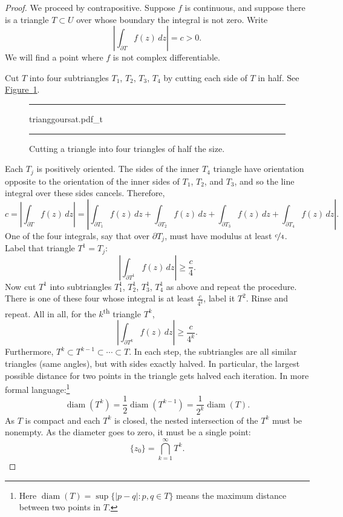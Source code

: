 \documentclass[12pt,openany]{book}
\newcommand{\sabs}[1]{\lvert {#1} \rvert}
\newcommand{\abs}[1]{\left\lvert {#1} \right\rvert}
\theoremstyle{plain}
\theoremstyle{remark}
\theoremstyle{definition}
\newenvironment{myfig}{%
\begin{figure}[h!t]
\noindent\rule{\textwidth}{0.5pt}\vspace{12pt}\par\centering}%
{\par\noindent\rule{\textwidth}{0.5pt}
\end{figure}}
\theoremstyle{exercise}
\theoremstyle{example}
\newcommand{\figureref}[1]{\hyperref[#1]{Figure~\ref*{#1}}}
\begin{document}
\begin{proof}
We proceed by contrapositive.
Suppose $f$ is continuous, and 
suppose there is a triangle $T \subset U$ over whose boundary the integral is not zero.
Write
\begin{equation*}
\abs{\int_{\partial T} f(z) \, dz} = c > 0 .
\end{equation*}
We will find a point
where $f$ is not complex differentiable.

Cut $T$ into four subtriangles
$T_1$, $T_2$, $T_3$, $T_4$ by cutting each side of $T$ in half.  See
\figureref{fig:trianggoursat}.
\begin{myfig}
{trianggoursat.pdf_t}
\caption{Cutting a triangle into four triangles of half the size.%
\label{fig:trianggoursat}}
\end{myfig}

Each $T_j$ is positively oriented.
The sides of the inner $T_4$ triangle have orientation opposite
to the orientation of the inner sides of $T_1$, $T_2$, and $T_3$, and
so the line integral over these sides cancels.  Therefore,
\begin{equation*}
c = 
\abs{\int_{\partial T} f(z) \, dz }
=
\abs{\int_{\partial T_1} f(z) \, dz 
+
\int_{\partial T_2} f(z) \, dz 
+
\int_{\partial T_3} f(z) \, dz 
+
\int_{\partial T_4} f(z) \, dz } .
\end{equation*}
One of the four integrals, say that over $\partial T_j$,
must have modulus at least $\nicefrac{c}{4}$.  Label
that triangle $T^1 = T_j$:
\begin{equation*}
\abs{\int_{\partial T^1} f(z) \, dz } \geq \frac{c}{4} .
\end{equation*}
Now cut $T^1$ into subtriangles
$T_1^1$, $T_2^1$, $T_3^1$, $T_4^1$ as above and repeat the procedure.  There
is one of these four whose integral is at least $\frac{c}{4^2}$, label it
$T^2$.  Rinse and repeat.
All in all, for the $k$\textsuperscript{th} triangle $T^k$,
\begin{equation*}
\abs{\int_{\partial T^k} f(z) \, dz } \geq \frac{c}{4^k} .
\end{equation*}
Furthermore, $T^k \subset T^{k-1} \subset \cdots \subset T$.
In each step, the subtriangles are all similar triangles (same angles),
but with sides exactly halved.
In particular,
the largest possible distance for two points in the triangle 
gets halved each iteration.
In more formal language:\footnote{%
Here $\operatorname{diam}(T)= \sup \{ \sabs{p-q} : p,q \in T \}$
means the maximum distance between two points in $T$.}
\begin{equation*}
\operatorname{diam}(T^k) =
\frac{1}{2} \operatorname{diam}(T^{k-1})
=
\frac{1}{2^k} \operatorname{diam}(T) .
\end{equation*}
As $T$ is compact and each $T^k$ is closed, the nested intersection of the $T^k$ must be nonempty.
As the diameter goes to zero, it must be a single point:
\begin{equation*}
\{ z_0 \} = \bigcap_{k=1}^\infty T^k .
\end{equation*}


\end{proof}
\end{document}

